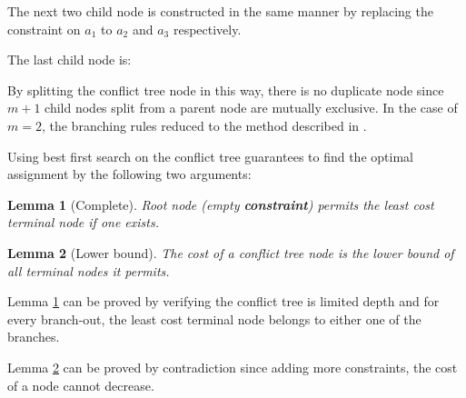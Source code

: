 \documentclass{article}
\newtheorem{lemma}{Lemma}
\begin{document}
    The next two child node is constructed in the same manner by replacing the constraint on $a_1$ to $a_2$ and $a_3$ respectively.

    The last child node is:


    By splitting the conflict tree node in this way, there is no duplicate node since $m+1$ child nodes split from a parent node are mutually exclusive. In the case of $m=2$, the branching rules reduced to the method described in \cite{sharon2015conflict}.

    Using best first search on the conflict tree guarantees to find the optimal assignment by the following two arguments:

    \begin{lemma}[Complete]
        Root node (empty \textbf{constraint}) permits the least cost terminal node if one exists.
        \label{lemma:complete}
    \end{lemma}

    \begin{lemma}[Lower bound]
        The cost of a conflict tree node is the lower bound of all terminal nodes it permits.
        \label{lemma:lowerbound}
    \end{lemma}

    Lemma \ref{lemma:complete} can be proved by verifying the conflict tree is limited depth and for every branch-out, the least cost terminal node belongs to either one of the branches.

    Lemma \ref{lemma:lowerbound} can be proved by contradiction since adding more constraints, the cost of a node cannot decrease.


    
\end{document}
